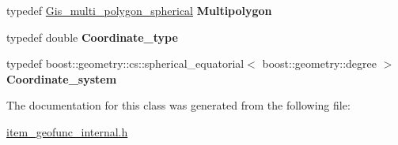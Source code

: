 \begin{DoxyCompactItemize}
typedef \mbox{\hyperlink{classGis__multi__polygon__spherical}{Gis\+\_\+multi\+\_\+polygon\+\_\+spherical}} {\bfseries Multipolygon}
\item 
\mbox{\label{classBG__models_3_01boost_1_1geometry_1_1cs_1_1spherical__equatorial_3_01boost_1_1geometry_1_1degree_01_4_01_4_ae91ab4682a3a6d796c73f49e6feb9f81}} 
typedef double {\bfseries Coordinate\+\_\+type}
\item 
\mbox{\label{classBG__models_3_01boost_1_1geometry_1_1cs_1_1spherical__equatorial_3_01boost_1_1geometry_1_1degree_01_4_01_4_a3316b694fef0fb42f96b65ff6498a231}} 
typedef boost\+::geometry\+::cs\+::spherical\+\_\+equatorial$<$ boost\+::geometry\+::degree $>$ {\bfseries Coordinate\+\_\+system}
\end{DoxyCompactItemize}


The documentation for this class was generated from the following file\+:\begin{DoxyCompactItemize}
\item 
\mbox{\hyperlink{item__geofunc__internal_8h}{item\+\_\+geofunc\+\_\+internal.\+h}}\end{DoxyCompactItemize}
